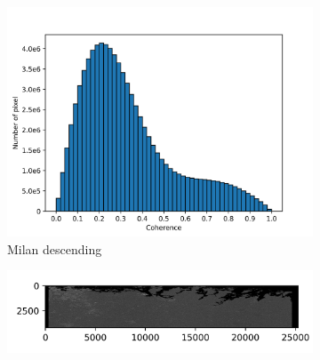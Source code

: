 \documentclass[a4paper,fleqn]{cas-sc}
\begin{document}
\begin{figure}
\begin{subfigure}{0.5\textwidth}
\begin{minipage}{0.5\textwidth}
        \end{minipage}%
        \begin{minipage}{0.5\textwidth}
            \centering
            \includegraphics[width=\textwidth]{figure/The coherence/coh_Milan_des_esd1_histogram_.png}
        \end{minipage}
        \caption{Milan descending}
        \label{fig_6g}
    \end{subfigure}%
    \hfill
    \begin{subfigure}{0.5\textwidth}
        \centering
        \begin{minipage}{0.5\textwidth}
            \centering
            \includegraphics[width=\textwidth]{figure/The coherence/coh_Finland_asc_esd1.png}
        \end{minipage}%
        \begin{minipage}{0.5\textwidth}
            \centering

\end{minipage}
\end{subfigure}
\end{figure}
\end{document}

